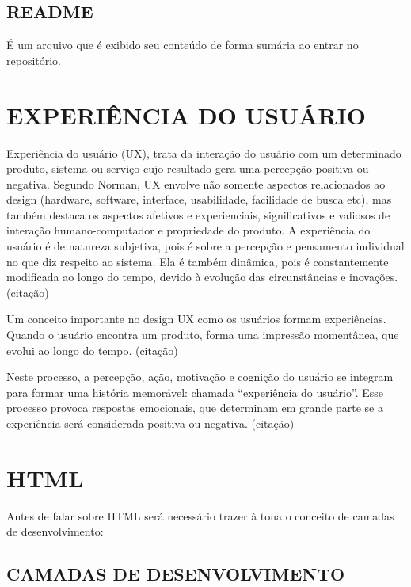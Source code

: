 	\subsection{README}
	\label{subsec:README}
		É um arquivo que é exibido seu conteúdo de forma sumária ao entrar no repositório.

	
\section{EXPERIÊNCIA DO USUÁRIO}
\label{sec:EXPERIENCIADOUSUARIO}

	Experiência do usuário (UX), trata da interação do usuário com um
	determinado produto, sistema ou serviço cujo resultado gera uma
	percepção positiva ou negativa. Segundo Norman, UX envolve não somente
	aspectos relacionados ao design (hardware, software, interface,
	usabilidade, facilidade de busca etc), mas também destaca os aspectos
	afetivos e experienciais, significativos e valiosos de interação
	humano-computador e propriedade do produto. A experiência do usuário é
	de natureza subjetiva, pois é sobre a percepção e pensamento individual
	no que diz respeito ao sistema. Ela é também dinâmica, pois é
	constantemente modificada ao longo do tempo, devido à evolução das
	circunstâncias e inovações. (citação)
	
	Um conceito importante no design UX como os usuários formam
	experiências. Quando o usuário encontra um produto, forma uma impressão
	momentânea, que evolui ao longo do tempo. (citação)
	
	Neste processo, a percepção, ação, motivação e cognição do usuário se
	integram para formar uma história memorável: chamada “experiência do
	usuário”. Esse processo provoca respostas emocionais, que determinam em
	grande parte se a experiência será considerada positiva ou negativa.
	(citação) 

\section{HTML}
\label{sec:HTML}
	Antes de falar sobre HTML será necessário trazer à tona o conceito de camadas de desenvolvimento:
	\subsection{CAMADAS DE DESENVOLVIMENTO}
	\label{sec:CAMADASDEDESENVOLVIMENTO}
	
